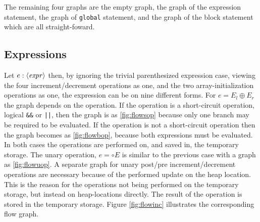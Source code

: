 The remaining four graphs are the empty graph, the graph of the expression statement, the graph of \texttt{global} statement, and the graph of the block statement which are all straight-foward.


\subsection{Expressions}

Let $e : \langle\mathit{expr}\rangle$ then, by ignoring the trivial parenthesized expression case, viewing the four increment/decrement operations as one, and the two array-initialization operations as one, the expression can be on nine different forms. For $e = E_l \oplus E_r$ the graph depends on the operation. If the operation is a short-circuit operation, logical \texttt{\&\&} or \texttt{||}, then the graph is as \ref{fig:flowsop} because only one branch may be required to be evaluated. If the operation is not a short-circuit operation then the graph becomes as \ref{fig:flowbop}, because both expressions must be evaluated. In both cases the operations are performed on, and saved in, the temporary storage. The unary operation, $e = \circ E$ is similar to the previous case with a graph as \ref{fig:flowuop}. A separate graph for unary post/pre increment/decrement operations are necessary because of the performed update on the heap location. This is the reason for the operations not being performed on the temporary storage, but instead on heap-locations directly. The result of the operation is stored in the temporary storage. Figure \ref{fig:flowinc} illustrates the corresponding flow graph.
